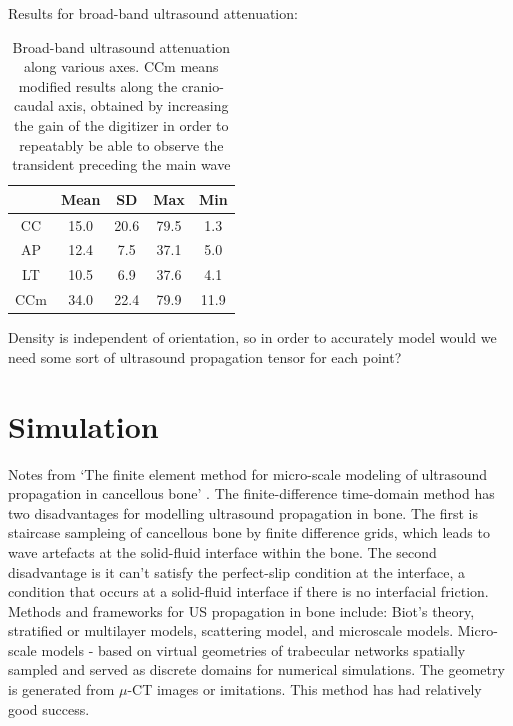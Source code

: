 \documentclass[11pt,titlepage]{article} %
\begin{document}
 Results for broad-band ultrasound attenuation:
 \begin{table}[!h]
\begin{center}
  \begin{tabular}{| c | c | c | c | c | }
    \hline
     & Mean & SD & Max & Min \\ \hline
     CC & 15.0 & 20.6 & 79.5 & 1.3 \\ 
     AP & 12.4 & 7.5 & 37.1 & 5.0 \\ 
     LT & 10.5 & 6.9 & 37.6 & 4.1 \\ 
     CCm & 34.0 & 22.4 & 79.9 & 11.9 \\
    \hline
  \end{tabular}
\end{center}
\caption{Broad-band ultrasound attenuation along various axes. CCm means modified results along the cranio-caudal axis, obtained by increasing the gain of the digitizer in order to repeatably be able to observe the transident preceding the main wave}
\end{table}

Density is independent of orientation, so in order to accurately model would we need some sort of ultrasound propagation tensor for each point? 
 

\section{Simulation}

Notes from `The finite element method for micro-scale modeling of ultrasound propagation in cancellous bone' \cite{vafaeian2014finite}. 
The finite-difference time-domain method has two disadvantages for modelling ultrasound propagation in bone. The first is staircase sampleing of cancellous bone by finite difference grids, which leads to wave artefacts at the solid-fluid interface within the bone. The second disadvantage is it can't satisfy the perfect-slip condition at the interface, a condition that occurs at a solid-fluid interface if there is no interfacial friction. 
Methods and frameworks for US propagation in bone include: Biot's theory, stratified or multilayer models, scattering model, and microscale models. 
Micro-scale models - based on virtual geometries of trabecular networks spatially sampled and served as discrete domains for numerical simulations. The geometry is generated from $\mu$-CT images or imitations. This method has had relatively good success. 
\end{document}

